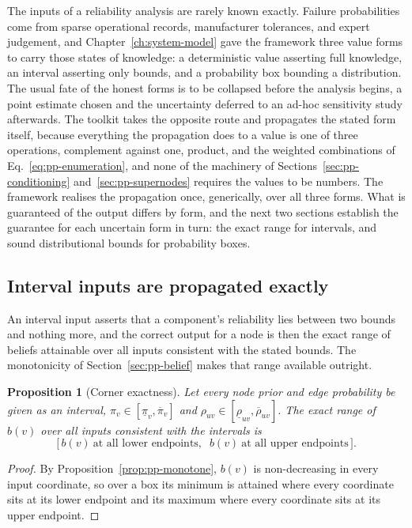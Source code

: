 \documentclass[12pt]{report}
\newtheorem{proposition}[theorem]{Proposition}
\begin{document}
The inputs of a reliability analysis are rarely known exactly. Failure probabilities come from sparse operational records, manufacturer tolerances, and expert judgement, and Chapter~\ref{ch:system-model} gave the framework three value forms to carry those states of knowledge: a deterministic value asserting full knowledge, an interval asserting only bounds, and a probability box bounding a distribution. The usual fate of the honest forms is to be collapsed before the analysis begins, a point estimate chosen and the uncertainty deferred to an ad-hoc sensitivity study afterwards. The toolkit takes the opposite route and propagates the stated form itself, because everything the propagation does to a value is one of three operations, complement against one, product, and the weighted combinations of Eq.~\eqref{eq:pp-enumeration}, and none of the machinery of Sections~\ref{sec:pp-conditioning} and~\ref{sec:pp-supernodes} requires the values to be numbers. The framework realises the propagation once, generically, over all three forms. What is guaranteed of the output differs by form, and the next two sections establish the guarantee for each uncertain form in turn: the exact range for intervals, and sound distributional bounds for probability boxes.

\subsection{Interval inputs are propagated exactly}
\label{sec:pp-interval}

An interval input asserts that a component's reliability lies between two bounds and nothing more, and the correct output for a node is then the exact range of beliefs attainable over all inputs consistent with the stated bounds. The monotonicity of Section~\ref{sec:pp-belief} makes that range available outright.

\begin{proposition}[Corner exactness]
\label{prop:pp-corners}
Let every node prior and edge probability be given as an interval, $\pi_v \in [\underline{\pi}_v, \overline{\pi}_v]$ and $\rho_{uv} \in [\underline{\rho}_{uv}, \overline{\rho}_{uv}]$. The exact range of $b(v)$ over all inputs consistent with the intervals is
\[
\bigl[\, b(v)\ \text{at all lower endpoints},\;\; b(v)\ \text{at all upper endpoints} \,\bigr].
\]
\end{proposition}

\begin{proof}
By Proposition~\ref{prop:pp-monotone}, $b(v)$ is non-decreasing in every input coordinate, so over a box its minimum is attained where every coordinate sits at its lower endpoint and its maximum where every coordinate sits at its upper endpoint.
\end{proof}
\end{document}
